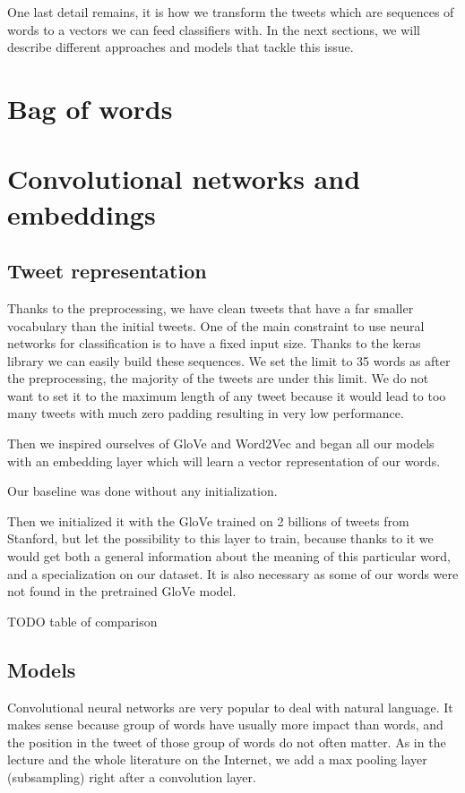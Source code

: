 \documentclass[10pt,conference,compsocconf]{IEEEtran}
\begin{document}
One last detail remains, it is how we transform the tweets which are sequences of words to a vectors we can feed classifiers with. In the next sections, we will describe different approaches and models that tackle this issue.

\section{Bag of words}

\section{Convolutional networks and embeddings}

\subsection{Tweet representation}

Thanks to the preprocessing, we have clean tweets that have a far smaller vocabulary than the initial tweets. One of the main constraint to use neural networks for classification is to have a fixed input size. Thanks to the keras library we can easily build these sequences. We set the limit to 35 words as after the preprocessing, the majority of the tweets are under this limit. We do not want to set it to the maximum length of any tweet because it would lead to too many tweets with much zero padding resulting in very low performance.

Then we inspired ourselves of GloVe and Word2Vec and began all our models with an embedding layer which will learn a vector representation of our words.

Our baseline was done without any initialization.

Then we initialized it with the GloVe trained on 2 billions of tweets from Stanford, but let the possibility to this layer to train, because thanks to it we would get both a general information about the meaning of this particular word, and a specialization on our dataset. It is also necessary as some of our words were not found in the pretrained GloVe model.

TODO table of comparison

\subsection{Models}

Convolutional neural networks are very popular to deal with natural language. It makes sense because group of words have usually more impact than words, and the position in the tweet of those group of words do not often matter.
As in the lecture and the whole literature on the Internet, we add a max pooling layer (subsampling) right after a convolution layer.
\end{document}
